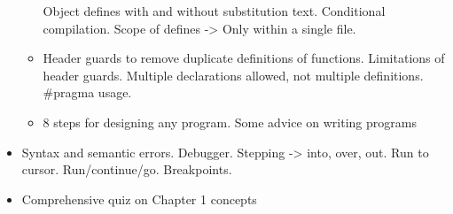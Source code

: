 \begin{itemize}
\begin{itemize}
        Object defines with and without substitution text. Conditional compilation. Scope of defines -> Only within a single file.
        \item Header guards to remove duplicate definitions of functions. Limitations of header guards. Multiple declarations allowed, not 
        multiple definitions. \#pragma usage.
        \item 8 steps for designing any program. Some advice on writing programs
    \end{itemize}
    \item Syntax and semantic errors. Debugger. Stepping -> into, over, out. Run to cursor. Run/continue/go. Breakpoints.
    \item Comprehensive quiz on Chapter 1 concepts
\end{itemize}
